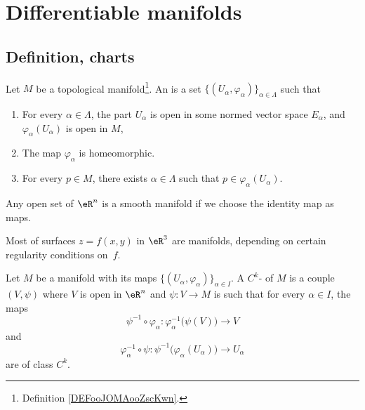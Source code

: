 

\section{Differentiable manifolds}

\subsection{Definition, charts}

\begin{definition}		\label{DEFooRUVIooSZDjlE}
	Let \( M\) be a topological manifold\footnote{Definition \ref{DEFooJOMAooZscKwn}.}. An  is a set \( \{ (U_{\alpha}, \varphi_{\alpha})\}_{\alpha\in\Lambda}\) such that
	\begin{enumerate}
		\item
		      For every \( \alpha\in\Lambda\), the part \( U_{\alpha}\) is open in some normed vector space \( E_{\alpha}\), and \( \varphi_{\alpha}(U_{\alpha})\) is open in \( M\),
		\item
		      The map \( \varphi_{\alpha}\) is homeomorphic.
		\item
		      For every \( p\in M\), there exists \( \alpha\in \Lambda\) such that \( p\in \varphi_{\alpha}(U_{\alpha})\).
	\end{enumerate}
\end{definition}

\begin{example}
	Any open set of $\eR^n$ is a smooth manifold if we choose the identity map as maps.
\end{example}

Most of surfaces $z=f(x,y)$ in $\eR^3$ are manifolds, depending on certain regularity conditions on~$f$.

\begin{definition}       \label{DEFooQLPIooPGagtz}
	Let \( M\) be a manifold with its maps \(  \{ (U_{\alpha}, \varphi_{\alpha}) \}_{\alpha\in I}   \). A \( C^k\)- of \( M\) is a couple \( (V,\psi)\) where \( V\) is open in \( \eR^n\) and \( \psi\colon V\to M\) is such that for every \( \alpha\in I\), the maps
	\begin{equation}
		\psi^{-1}\circ \varphi_{\alpha}\colon \varphi_{\alpha}^{-1}\big( \psi(V) \big)\to V
	\end{equation}
	and
	\begin{equation}
		\varphi_{\alpha}^{-1}\circ \psi\colon \psi^{-1}\big( \varphi_{\alpha}(U_{\alpha}) \big)\to U_{\alpha}
	\end{equation}
	are of class \( C^k\).
\end{definition}

